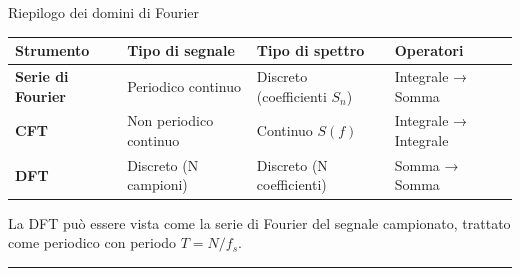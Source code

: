 \documentclass[
  italian,
  openany]{book}
\newcounter{none} %
\begin{document}
\begin{calloutnote}{Riepilogo dei domini di Fourier}

{\def\LTcaptype{none} %
\begin{longtable}[]{@{}
  >{\raggedright\arraybackslash}p{}
  >{\raggedright\arraybackslash}p{}
  >{\raggedright\arraybackslash}p{}
  >{\raggedright\arraybackslash}p{}@{}}
\toprule\noalign{}
\begin{minipage}[b]{\linewidth}\raggedright
Strumento
\end{minipage} & \begin{minipage}[b]{\linewidth}\raggedright
Tipo di segnale
\end{minipage} & \begin{minipage}[b]{\linewidth}\raggedright
Tipo di spettro
\end{minipage} & \begin{minipage}[b]{\linewidth}\raggedright
Operatori
\end{minipage} \\
\midrule\noalign{}
\endhead
\bottomrule\noalign{}
\endlastfoot
\textbf{Serie di Fourier} & Periodico continuo & Discreto (coefficienti
\(S_n\)) & Integrale → Somma \\
\textbf{CFT} & Non periodico continuo & Continuo \(S(f)\) & Integrale →
Integrale \\
\textbf{DFT} & Discreto (N campioni) & Discreto (N coefficienti) & Somma
→ Somma \\
\end{longtable}
}

La DFT può essere vista come la serie di Fourier del segnale campionato,
trattato come periodico con periodo \(T = N/f_s\).

\end{calloutnote}

\begin{center}\rule{0.5\linewidth}{0.5pt}\end{center}
\end{document}
